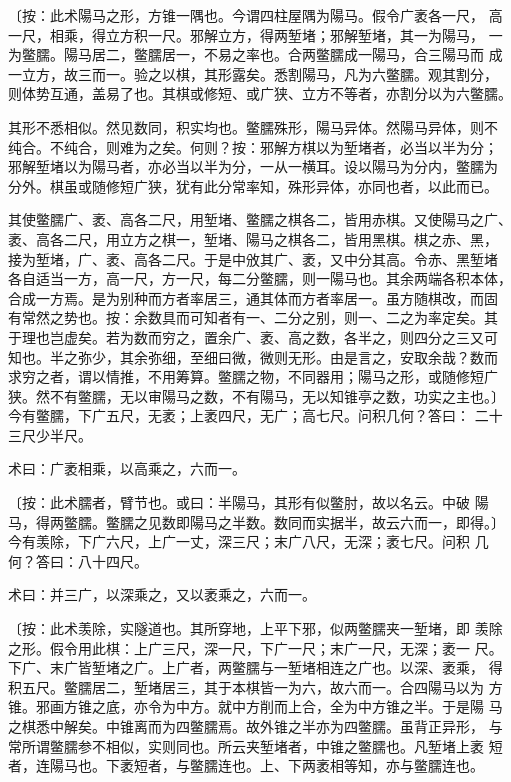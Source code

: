 \documentclass[a4paper,12pt,UTF8,twoside]{ctexbook}
\begin{document}
〔按：此术陽马之形，方锥一隅也。今谓四柱屋隅为陽马。假令广袤各一尺， 高一尺，相乘，得立方积一尺。邪解立方，得两堑堵；邪解堑堵，其一为陽马， 一为鳖臑。陽马居二，鳖臑居一，不易之率也。合两鳖臑成一陽马，合三陽马而 成一立方，故三而一。验之以棋，其形露矣。悉割陽马，凡为六鳖臑。观其割分， 则体势互通，盖易了也。其棋或修短、或广狭、立方不等者，亦割分以为六鳖臑。

其形不悉相似。然见数同，积实均也。鳖臑殊形，陽马异体。然陽马异体，则不 纯合。不纯合，则难为之矣。何则？按：邪解方棋以为堑堵者，必当以半为分； 邪解堑堵以为陽马者，亦必当以半为分，一从一横耳。设以陽马为分内，鳖臑为 分外。棋虽或随修短广狭，犹有此分常率知，殊形异体，亦同也者，以此而已。

其使鳖臑广、袤、高各二尺，用堑堵、鳖臑之棋各二，皆用赤棋。又使陽马之广、 袤、高各二尺，用立方之棋一，堑堵、陽马之棋各二，皆用黑棋。棋之赤、黑， 接为堑堵，广、袤、高各二尺。于是中攽其广、袤，又中分其高。令赤、黑堑堵 各自适当一方，高一尺，方一尺，每二分鳖臑，则一陽马也。其余两端各积本体， 合成一方焉。是为别种而方者率居三，通其体而方者率居一。虽方随棋改，而固 有常然之势也。按：余数具而可知者有一、二分之别，则一、二之为率定矣。其 于理也岂虚矣。若为数而穷之，置余广、袤、高之数，各半之，则四分之三又可 知也。半之弥少，其余弥细，至细曰微，微则无形。由是言之，安取余哉？数而 求穷之者，谓以情推，不用筹算。鳖臑之物，不同器用；陽马之形，或随修短广 狭。然不有鳖臑，无以审陽马之数，不有陽马，无以知锥亭之数，功实之主也。〕 今有鳖臑，下广五尺，无袤；上袤四尺，无广；高七尺。问积几何？答曰： 二十三尺少半尺。

术曰：广袤相乘，以高乘之，六而一。

〔按：此术臑者，臂节也。或曰：半陽马，其形有似鳖肘，故以名云。中破 陽马，得两鳖臑。鳖臑之见数即陽马之半数。数同而实据半，故云六而一，即得。〕 今有羡除，下广六尺，上广一丈，深三尺；末广八尺，无深；袤七尺。问积 几何？答曰：八十四尺。

术曰：并三广，以深乘之，又以袤乘之，六而一。

〔按：此术羡除，实隧道也。其所穿地，上平下邪，似两鳖臑夹一堑堵，即 羡除之形。假令用此棋：上广三尺，深一尺，下广一尺；末广一尺，无深；袤一 尺。下广、末广皆堑堵之广。上广者，两鳖臑与一堑堵相连之广也。以深、袤乘， 得积五尺。鳖臑居二，堑堵居三，其于本棋皆一为六，故六而一。合四陽马以为 方锥。邪画方锥之底，亦令为中方。就中方削而上合，全为中方锥之半。于是陽 马之棋悉中解矣。中锥离而为四鳖臑焉。故外锥之半亦为四鳖臑。虽背正异形， 与常所谓鳖臑参不相似，实则同也。所云夹堑堵者，中锥之鳖臑也。凡堑堵上袤 短者，连陽马也。下袤短者，与鳖臑连也。上、下两袤相等知，亦与鳖臑连也。
\end{document}
